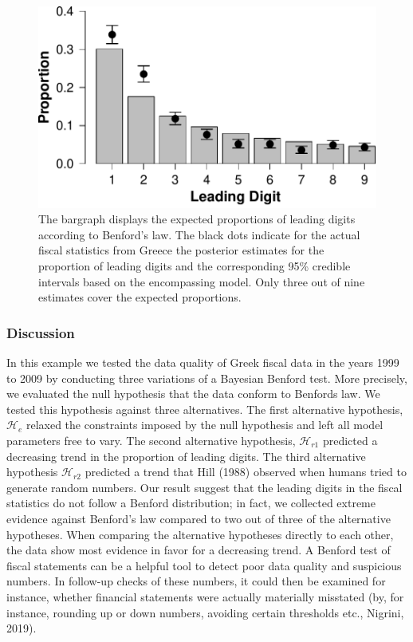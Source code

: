 \documentclass[
  english,
  man,floatsintext]{apa6}
\begin{document}
\begin{figure}
\centering
\includegraphics{Rpackage_paper_files/figure-latex/benford-1.pdf}
\caption{\label{fig:benford}The bargraph displays the expected proportions of leading digits according to Benford's law. The black dots indicate for the actual fiscal statistics from Greece the posterior estimates for the proportion of leading digits and the corresponding 95\% credible intervals based on the encompassing model. Only three out of nine estimates cover the expected proportions.
}
\end{figure}

\hypertarget{discussion}{%
\subsubsection{Discussion}\label{discussion}}

In this example we tested the data quality of Greek fiscal data in the years 1999 to 2009 by conducting three variations of a Bayesian Benford test. More precisely, we evaluated the null hypothesis that the data conform to Benfords law. We tested this hypothesis against three alternatives. The first alternative hypothesis, \(\mathcal{H}_e\) relaxed the constraints imposed by the null hypothesis and left all model parameters free to vary. The second alternative hypothesis, \(\mathcal{H}_{r1}\) predicted a decreasing trend in the proportion of leading digits. The third alternative hypothesis \(\mathcal{H}_{r2}\) predicted a trend that Hill (1988) observed when humans tried to generate random numbers. Our result suggest that the leading digits in the fiscal statistics do not follow a Benford distribution; in fact, we collected extreme evidence against Benford's law compared to two out of three of the alternative hypotheses. When comparing the alternative hypotheses directly to each other, the data show most evidence in favor for a decreasing trend. A Benford test of fiscal statements can be a helpful tool to detect poor data quality and suspicious numbers. In follow-up checks of these numbers, it could then be examined for instance, whether financial statements were actually materially misstated (by, for instance, rounding up or down numbers, avoiding certain thresholds etc., Nigrini, 2019).
\end{document}
